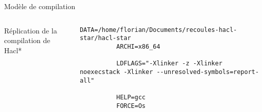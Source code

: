 \documentclass[A4,svgnames,9pt,aspectratio=169]{beamer}
\begin{document}
\begin{frame}[fragile]{Modèle de compilation}

  \begin{columns}
    \begin{column}{0.5\textwidth}
      \begin{block}{Réplication de la compilation de Hacl*}
        \large{
                }
      \end{block}
    \end{column}
    \begin{column}{0.5\textwidth}
        \begin{lstlisting}[style=MakefileStyle, gobble=10, caption={Makefile.config}]
          DATA=/home/florian/Documents/recoules-hacl-star/hacl-star
          ARCHI=x86_64

          LDFLAGS="-Xlinker -z -Xlinker noexecstack -Xlinker --unresolved-symbols=report-all"

          HELP=gcc
          FORCE=Os
        \end{lstlisting}
    \end{column}
  \end{columns}
\end{frame}
      
\end{document}
